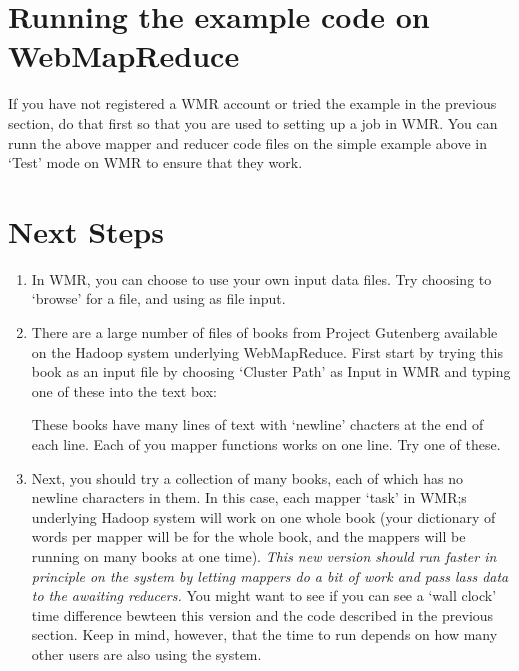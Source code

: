 \documentclass[letterpaper,10pt,openany,oneside]{sphinxmanual}
\begin{document}
\section{Running the example code on WebMapReduce}
\label{wmr_py/wmr_py:running-the-example-code-on-webmapreduce}
If you have not registered a WMR account or tried the example in the previous section,
do that first so that you are used to setting up a job in WMR.  You can runn
the above mapper and reducer code files on the simple example above in `Test'
mode on WMR to ensure that they work.


\section{Next Steps}
\label{wmr_py/wmr_py:next-steps}\begin{enumerate}
\item {} 
In WMR, you can choose to use your own input data files. Try
choosing to `browse' for a file, and using  as file
input.

\item {} 
There are a large number of files of books from Project
Gutenberg available on the Hadoop system underlying WebMapReduce.
First start by trying this book as an input file by choosing
`Cluster Path' as Input in WMR and typing one of these into the
text box:


These books have many lines of text with `newline' chacters at the
end of each line. Each of you mapper functions works on one line.
Try one of these.

\item {} 
Next, you should try a collection of many books, each of which
has no newline characters in them. In this case, each mapper `task'
in WMR;s underlying Hadoop system will work on one whole book (your dictionary of words per
mapper will be for the whole book, and the mappers will be running
on many books at one time). \emph{This new version should run faster in principle
on the system by letting mappers do a bit of work and pass lass data
to the awaiting reducers.}  You might want to see if you can see a
`wall clock' time difference bewteen this version and the code
described in the previous section.  Keep in mind, however, that
the time to run depends on how many other users are also using the system.


\end{enumerate}
\end{document}
